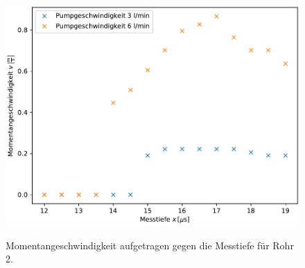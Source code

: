 \begin{figure}[H]
    \centering
    \caption{Momentangeschwindigkeit aufgetragen gegen die Messtiefe für Rohr 2.}
    \includegraphics[width=\linewidth]{plot4.pdf}
    \label{fig:Momentan_2}
\end{figure}
                                            
